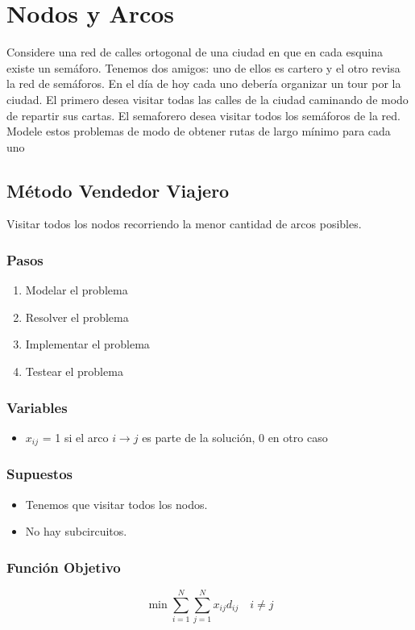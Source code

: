 \documentclass{article}
\begin{document}
\section{Nodos y Arcos}
Considere una red de calles ortogonal de una ciudad en que en cada esquina existe un semáforo. Tenemos
dos amigos: uno de ellos es cartero y el otro revisa la red de semáforos. En el día de hoy cada uno debería
organizar un tour por la ciudad. El primero desea visitar todas las calles de la ciudad caminando de
modo de repartir sus cartas. El semaforero desea visitar todos los semáforos de la red. Modele estos
problemas de modo de obtener rutas de largo mínimo para cada uno


\subsection{Método Vendedor Viajero}
Visitar todos los nodos recorriendo la menor cantidad de arcos posibles.
\subsubsection*{Pasos}
\begin{enumerate}
    \item Modelar el problema
    \item Resolver el problema
    \item Implementar el problema
    \item Testear el problema
\end{enumerate}
\subsubsection*{Variables}
\begin{itemize}
    \item \(x_{ij}\) = 1 si el arco \(i \rightarrow j\) es parte de la solución, 0 en otro caso
\end{itemize}
\subsubsection*{Supuestos}
\begin{itemize}
    \item Tenemos que visitar todos los nodos.
    \item No hay subcircuitos.
\end{itemize}
\subsubsection*{Función Objetivo}
\begin{equation}
    \min \sum_{i=1}^{N} \sum_{j=1}^{N} x_{ij}d_{ij} \quad i\neq j
\end{equation}
\end{document}
